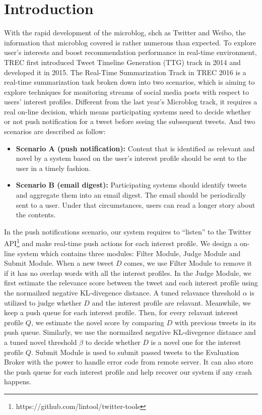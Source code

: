 \section{Introduction}
With the rapid development of the microblog, shch as Twitter and Weibo,
the information that microblog covered is rather numerous than expected.
To explore user's interests and boost recommendation performance in real-time environment,
TREC first introduced Tweet Timeline Generation (TTG) track in 2014\cite{lin2014overview} and developed it in 2015.
The Real-Time Summarization Track in TREC 2016 is a real-time summarization task broken down into two scenarios,
which is aiming to explore techniques for monitoring streams of social media posts with respect to users' interest profiles.
Different from the last year's Microblog track, it requires a real on-line decision,
which means participating systems need to decide whether or not push notification for a tweet before seeing the subsequent tweets.
And two scenarios are described as follow:

\begin{itemize}
\item \textbf{Scenario A (push notification):} Content that is identified as relevant and novel by a system based on the user's interest profile should be sent to the user in a timely fashion. 
\item \textbf{Scenario B (email digest):} Participating systems should identify tweets and aggregate them into an email digest. The email should be periodically sent to a user. Under that circumstances, users can read a longer story about the contents.
\end{itemize}

In the push notifications scenario, our system requires to ``listen'' to
the Twitter API\footnote{https://github.com/lintool/twitter-tools}
and make real-time push actions for each interest profile.
We design a on-line system which contains three modules:
Filter Module, Judge Module and Submit Module.
When a new tweet $D$ comes, we use Filter Module to remove it
if it has no overlap words with all the interest profiles.
In the Judge Module, we first estimate the relevance score between the tweet
and each interest profile using the normailzed negative KL-divegence distance.
A tuned relavance threshold $\alpha$ is utilized to judge whether $D$ and
the interest profile are relavant.
Meanwhile, we keep a push queue for each interest profile.
Then, for every relavant interest profile $Q$, we estimate the novel score by comparing $D$
with previous tweets in its push queue.
Similarly, we use the normailzed negative KL-divegence distance and a tuned
novel threshold $\beta$ to decide whether $D$ is a novel one for the interest profile $Q$.
Submit Module is used to submit passed tweets to the Evaluation Broker with the power to 
handle error code from remote server.
It can also store the push queue for each interest profile and help recover our system
if any crash happens.


